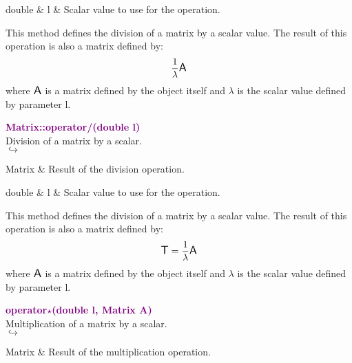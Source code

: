 \begin{tcolorbox}[width=\textwidth,myArgs,tabularx={ll|R}]
double & l & Scalar value to use for the operation.
\end{tcolorbox}

This method defines the division of a matrix by a scalar value.
The result of this operation is also a matrix defined by:
\begin{equation*}
\frac{1}{\lambda} \mbox{\large\ensuremath{\mathsf{A}}}
\end{equation*}
where $\mbox{\large\ensuremath{\mathsf{A}}}$ is a matrix defined by the object itself and $\lambda$ is the scalar value defined by parameter l.

\textcolor{purple}{\textbf{Matrix::operator/(double l)}}\label{Matrix::operator/(double l)}\\
Division of a matrix by a scalar.\\ \hspace*{5mm}$\hookrightarrow$
\vspace*{-2em}\begin{tcolorbox}[grow to left by=-1cm, width=\textwidth-1cm,myArgs,tabularx={l|R}]
Matrix & Result of the division operation.
\end{tcolorbox}

\begin{tcolorbox}[width=\textwidth,myArgs,tabularx={ll|R}]
double & l & Scalar value to use for the operation.
\end{tcolorbox}

This method defines the division of a matrix by a scalar value.
The result of this operation is also a matrix defined by:
\begin{equation*}
\mbox{\large\ensuremath{\mathsf{T}}} = \frac{1}{\lambda} \mbox{\large\ensuremath{\mathsf{A}}}
\end{equation*}
where $\mbox{\large\ensuremath{\mathsf{A}}}$ is a matrix defined by the object itself and $\lambda$ is the scalar value defined by parameter l.

\textcolor{purple}{\textbf{operator$\star$(double l, Matrix A)}}\label{operator*(double l, Matrix A)}\\
Multiplication of a matrix by a scalar.\\ \hspace*{5mm}$\hookrightarrow$
\vspace*{-2em}\begin{tcolorbox}[grow to left by=-1cm, width=\textwidth-1cm,myArgs,tabularx={l|R}]
Matrix & Result of the multiplication operation.
\end{tcolorbox}

